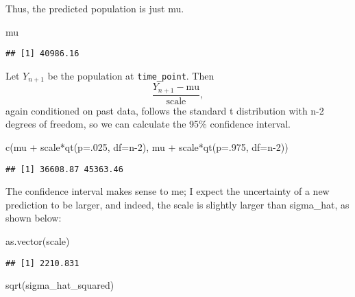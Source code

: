 \documentclass[
]{article}
\newenvironment{Shaded}{\begin{snugshade}}{\end{snugshade}}
\newcommand{\AttributeTok}[1]{\textcolor[rgb]{0.77,0.63,0.00}{#1}}
\newcommand{\DecValTok}[1]{\textcolor[rgb]{0.00,0.00,0.81}{#1}}
\newcommand{\FunctionTok}[1]{\textcolor[rgb]{0.00,0.00,0.00}{#1}}
\newcommand{\NormalTok}[1]{#1}
\newcommand{\SpecialCharTok}[1]{\textcolor[rgb]{0.00,0.00,0.00}{#1}}
\begin{document}
Thus, the predicted population is just mu.

\begin{Shaded}
\begin{Highlighting}[]
\NormalTok{mu}
\end{Highlighting}
\end{Shaded}

\begin{verbatim}
## [1] 40986.16
\end{verbatim}

Let \(Y_{n+1}\) be the population at \texttt{time\_point}. Then
\[\frac{Y_{n+1} - \text{mu}}{\text{scale}},\] again conditioned on past
data, follows the standard t distribution with n-2 degrees of freedom,
so we can calculate the 95\% confidence interval.

\begin{Shaded}
\begin{Highlighting}[]
\FunctionTok{c}\NormalTok{(mu }\SpecialCharTok{+}\NormalTok{ scale}\SpecialCharTok{*}\FunctionTok{qt}\NormalTok{(}\AttributeTok{p=}\NormalTok{.}\DecValTok{025}\NormalTok{, }\AttributeTok{df=}\NormalTok{n}\DecValTok{{-}2}\NormalTok{), mu }\SpecialCharTok{+}\NormalTok{ scale}\SpecialCharTok{*}\FunctionTok{qt}\NormalTok{(}\AttributeTok{p=}\NormalTok{.}\DecValTok{975}\NormalTok{, }\AttributeTok{df=}\NormalTok{n}\DecValTok{{-}2}\NormalTok{))}
\end{Highlighting}
\end{Shaded}

\begin{verbatim}
## [1] 36608.87 45363.46
\end{verbatim}

The confidence interval makes sense to me; I expect the uncertainty of a
new prediction to be larger, and indeed, the scale is slightly larger
than sigma\_hat, as shown below:

\begin{Shaded}
\begin{Highlighting}[]
\FunctionTok{as.vector}\NormalTok{(scale)}
\end{Highlighting}
\end{Shaded}

\begin{verbatim}
## [1] 2210.831
\end{verbatim}

\begin{Shaded}
\begin{Highlighting}[]
\FunctionTok{sqrt}\NormalTok{(sigma\_hat\_squared)}
\end{Highlighting}
\end{Shaded}
\end{document}
